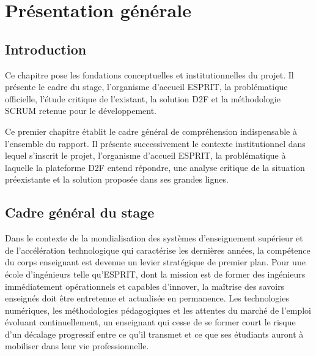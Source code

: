 \documentclass[12pt,a4paper]{report}
\begin{document}
\clearpage
{}
\setcounter{page}{1}

\chapter{Présentation générale}

\section{Introduction}

\begin{summaryframe}[frametitle={En bref — Chapitre 1}]
Ce chapitre pose les fondations conceptuelles et institutionnelles du projet.
Il présente le cadre du stage, l'organisme d'accueil ESPRIT, la problématique
officielle, l'étude critique de l'existant, la solution D2F et la méthodologie
SCRUM retenue pour le développement.
\end{summaryframe}

Ce premier chapitre établit le cadre général de compréhension indispensable à
l'ensemble du rapport. Il présente successivement le contexte institutionnel dans
lequel s'inscrit le projet, l'organisme d'accueil ESPRIT, la problématique à
laquelle la plateforme D2F entend répondre, une analyse critique de la situation
préexistante et la solution proposée dans ses grandes lignes.

\section{Cadre général du stage}

Dans le contexte de la mondialisation des systèmes d'enseignement supérieur et
de l'accélération technologique qui caractérise les dernières années, la
compétence du corps enseignant est devenue un levier stratégique de premier
plan. Pour une école d'ingénieurs telle qu'ESPRIT, dont la mission est de former
des ingénieurs immédiatement opérationnels et capables d'innover, la maîtrise
des savoirs enseignés doit être entretenue et actualisée en permanence. Les
technologies numériques, les méthodologies pédagogiques et les attentes du
marché de l'emploi évoluant continuellement, un enseignant qui cesse de se
former court le risque d'un décalage progressif entre ce qu'il transmet et ce
que ses étudiants auront à mobiliser dans leur vie professionnelle.
\end{document}
